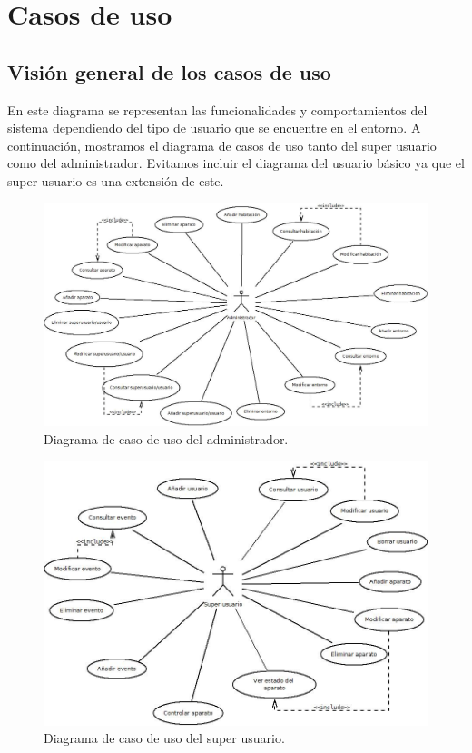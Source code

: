 \section{Casos de uso}
\subsection{Visi\'on general de los casos de uso}
En este diagrama se representan las funcionalidades y comportamientos del sistema dependiendo del tipo de usuario que se encuentre en el entorno.
A continuaci\'on, mostramos el diagrama de casos de uso tanto del super usuario como del administrador. Evitamos incluir el diagrama del usuario b\'asico ya que el super usuario es una extensi\'on de este.
\begin{figure}
	\centering
	\includegraphics[scale=0.5]{4.Disenio/Imagenes/CasosDeUsoDeAdministrador}
	\caption{Diagrama de caso de uso del administrador.}
\end{figure}

\begin{figure}
	\centering
	\includegraphics[scale=0.5]{4.Disenio/Imagenes/CasosDeUsoSuperUsuario}
	\caption{Diagrama de caso de uso del super usuario.}
\end{figure}

